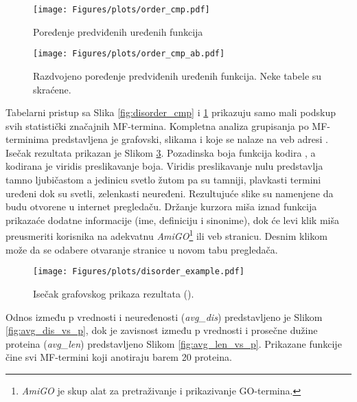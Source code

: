 
\begin{figure}[th]
\hspace*{-1.0cm} 
  \centering
\texttt{[image: Figures/plots/order\_cmp.pdf]}
\caption {
  Poređenje predviđenih uređenih funkcija
}
\label{fig:order_cmp}
\end{figure}

\begin{figure}[th]
\centering
\texttt{[image: Figures/plots/order\_cmp\_ab.pdf]}
\caption {
  Razdvojeno poređenje predviđenih uređenih funkcija. Neke tabele su skraćene.
}
\label{fig:order_cmp_ab}
\end{figure}


\clearpage

Tabelarni pristup sa Slika \ref{fig:disorder_cmp} i \ref{fig:order_cmp}
prikazuju samo mali podskup svih statistički značajnih MF-termina.  Kompletna
analiza grupisanja po MF-terminima predstavljena je grafovski, slikama
 i  koje se nalaze na veb adresi
\cite{rezultati}.  Isečak rezultata  prikazan
je Slikom \ref{fig:disorder_example}.  Pozadinska boja funkcija kodira
, a kodirana je viridis \cite{viridis} preslikavanje
boja. Viridis preslikavanje nulu predstavlja tamno ljubičastom a jedinicu svetlo
žutom pa su tamniji, plavkasti termini  uređeni dok su svetli, zelenkasti
neuređeni.  Rezultujuće  slike su namenjene da budu otvorene u
internet pregledaču.  Držanje kurzora miša iznad funkcija prikazaće dodatne
informacije (ime, definiciju i sinonime), dok će levi klik miša preusmeriti
korisnika na adekvatnu \textit{AmiGO}\footnote{\textit{AmiGO} je skup alat za
pretraživanje i prikazivanje GO-termina.} ili \uniprot veb stranicu. Desnim
klikom može da se odabere otvaranje stranice u novom tabu pregledača.

\begin{figure}[th]
  \centering
\texttt{[image: Figures/plots/disorder\_example.pdf]}
\caption {
  Isečak grafovskog prikaza rezultata ().
}
\label{fig:disorder_example}
\end{figure}


Odnos između p vrednosti i neuređenosti (\textit{avg\_dis}) predstavljeno
je Slikom \ref{fig:avg_dis_vs_p}, dok je zavisnost između p vrednosti i
prosečne dužine proteina (\textit{avg\_len}) predstavljeno Slikom
\ref{fig:avg_len_vs_p}. Prikazane funkcije čine svi MF-termini koji anotiraju
barem 20 proteina.

